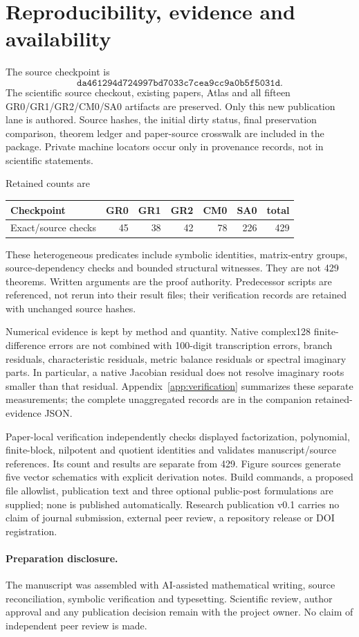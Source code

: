 \section{Reproducibility, evidence and availability}\label{sec:repro}
The source checkpoint is
\[
\texttt{da461294d724997bd7033c7cea9cc9a0b5f5031d}.
\]
The scientific source checkout, existing papers, Atlas and all fifteen GR0/GR1/GR2/CM0/SA0 artifacts are preserved. Only this new publication lane is authored. Source hashes, the initial dirty status, final preservation comparison, theorem ledger and paper-source crosswalk are included in the package. Private machine locators occur only in provenance records, not in scientific statements.

Retained counts are
\begin{center}
\begin{tabular}{lrrrrrr}\toprule
Checkpoint & GR0 & GR1 & GR2 & CM0 & SA0 & total\\\midrule
Exact/source checks &45&38&42&78&226&429\\\bottomrule
\end{tabular}
\end{center}
These heterogeneous predicates include symbolic identities, matrix-entry groups, source-dependency checks and bounded structural witnesses. They are not 429 theorems. Written arguments are the proof authority. Predecessor scripts are referenced, not rerun into their result files; their verification records are retained with unchanged source hashes.

Numerical evidence is kept by method and quantity. Native complex128 finite-difference errors are not combined with 100-digit transcription errors, branch residuals, characteristic residuals, metric balance residuals or spectral imaginary parts. In particular, a native Jacobian residual does not resolve imaginary roots smaller than that residual. Appendix~\ref{app:verification} summarizes these separate measurements; the complete unaggregated records are in the companion retained-evidence JSON.

Paper-local verification independently checks displayed factorization, polynomial, finite-block, nilpotent and quotient identities and validates manuscript/source references. Its count and results are separate from 429. Figure sources generate five vector schematics with explicit derivation notes. Build commands, a proposed file allowlist, publication text and three optional public-post formulations are supplied; none is published automatically. Research publication v0.1 carries no claim of journal submission, external peer review, a repository release or DOI registration.

\paragraph{Preparation disclosure.}
The manuscript was assembled with AI-assisted mathematical writing, source reconciliation, symbolic verification and typesetting. Scientific review, author approval and any publication decision remain with the project owner. No claim of independent peer review is made.
